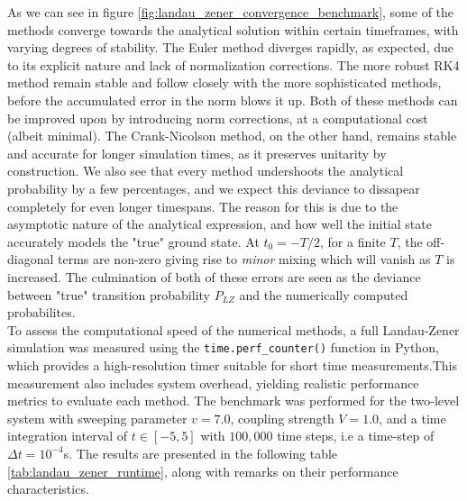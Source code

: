 \documentclass{subfiles}
\begin{document}
As we can see in figure \eqref{fig:landau_zener_convergence_benchmark}, some of the methods converge towards the analytical solution within certain timeframes, with varying degrees of stability. The Euler method diverges rapidly, as expected, due to its explicit nature and lack of normalization corrections. The more robust RK4 method remain stable and follow closely with the more sophisticated methods, before the accumulated error in the norm blows it up. Both of these methods can be improved upon by introducing norm corrections, at a computational cost (albeit minimal). The Crank-Nicolson method, on the other hand, remains stable and accurate for longer simulation times, as it preserves unitarity by construction. We also see that every method undershoots the analytical probability by a few percentages, and we expect this deviance to dissapear completely for even longer timespans. The reason for this is due to the asymptotic nature of the analytical expression, and how well the initial state accurately models the "true" ground state. At $t_{0} = -T/2$, for a finite $T$, the off-diagonal terms are non-zero giving rise to \emph{minor} mixing which will vanish as $T$ is increased. The culmination of both of these errors are seen as the deviance between "true" transition probability $P_{LZ}$ and the numerically computed probabilites. 
\\ 

To assess the computational speed of the numerical methods, a full Landau-Zener simulation was measured using the \texttt{time.perf\_counter()} function in Python, which provides a high-resolution timer suitable for short time measurements.This measurement also includes system overhead, yielding realistic performance metrics to evaluate each method. 
The benchmark was performed for the two-level system with sweeping parameter $v=7.0$, coupling strength $V=1.0$, and a time integration interval of $t \in [-5, 5]$ with $100{,}000$ time steps, i.e a time-step of $\Delta t = 10^{-4}$s. The results are presented in the following table \eqref{tab:landau_zener_runtime}, along with remarks on their performance characteristics.
\end{document}
